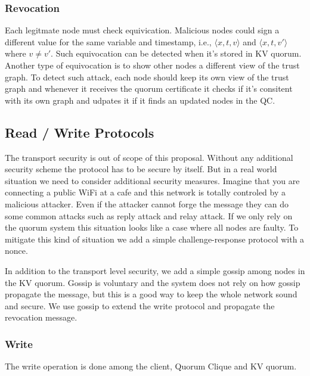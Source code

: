\documentclass[10pt,fleqn]{article}
\begin{document}
\subsubsection*{Revocation}
Each legitmate node must check equivication. Malicious nodes could sign a different value for the same variable and timestamp, i.e., $\langle x, t, v \rangle$ and $\langle x, t, v' \rangle$ where $v \ne v'$. Such equivocation can be detected when it's stored in KV quorum. Another type of equivocation is to show other nodes a different view of the trust graph. To detect such attack, each node should keep its own view of the trust graph and whenever it receives the quorum certificate it checks if it's consitent with its own graph and udpates it if it finds an updated nodes in the QC.

\subsection{Read / Write Protocols}
The transport security is out of scope of this proposal. Without any additional security scheme the protocol has to be secure by itself. But in a real world situation we need to consider additional security measures. Imagine that you are connecting a public WiFi at a cafe and this network is totally controled by a malicious attacker. Even if the attacker cannot forge the message they can do some common attacks such as reply attack and relay attack. If we only rely on the quorum system this situation looks like a case where all nodes are faulty. To mitigate this kind of situation we add a simple challenge-response protocol with a nonce.

In addition to the transport level security, we add a simple gossip among nodes in the KV quorum. Gossip is voluntary and the system does not rely on how gossip propagate the message, but this is a good way to keep the whole network sound and secure. We use gossip to extend the \textsf{write} protocol and propagate the revocation message.

\subsubsection*{Write}
The write operation is done among the client, Quorum Clique and KV quorum. 
\end{document}
